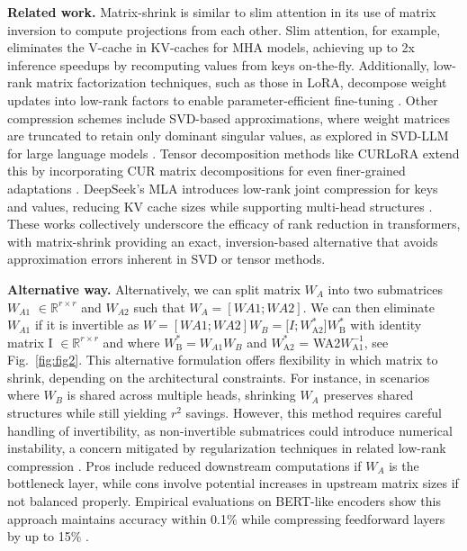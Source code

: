 \documentclass{article}
\begin{document}
\textbf{Related work.} Matrix-shrink is similar to slim attention \cite{graef2025slim} in its use of matrix inversion to compute projections from each other. Slim attention, for example, eliminates the V-cache in KV-caches for MHA models, achieving up to 2x inference speedups by recomputing values from keys on-the-fly. Additionally, low-rank matrix factorization techniques, such as those in LoRA, decompose weight updates into low-rank factors to enable parameter-efficient fine-tuning \cite{medium2025lora}. Other compression schemes include SVD-based approximations, where weight matrices are truncated to retain only dominant singular values, as explored in SVD-LLM for large language models \cite{github2024svdllm}. Tensor decomposition methods like CURLoRA extend this by incorporating CUR matrix decompositions for even finer-grained adaptations \cite{openreview2024svdllm}. DeepSeek's MLA introduces low-rank joint compression for keys and values, reducing KV cache sizes while supporting multi-head structures \cite{deepseek2024}. These works collectively underscore the efficacy of rank reduction in transformers, with matrix-shrink providing an exact, inversion-based alternative that avoids approximation errors inherent in SVD or tensor methods.

\textbf{Alternative way.} Alternatively, we can split matrix $W_A$ into two submatrices $W_{A1}$ $\in \mathbb{R}^{r \times r}$ and $W_{A2}$ such that $W_A = [WA1; WA2]$. We can then eliminate $W_{A1}$ if it is invertible as $W = [WA1; WA2] W_B = [I; W^{*}_{\text{A2}}$]$W^{*}_{\text{B}}$ with identity matrix I $\in \mathbb{R}^{r \times r}$ and where $W^{*}_{\text{B}} = W_{A1} W_B$ and $W^{*}_{\text{A2}}$ = WA2$W^{-1}_{\text{A1}}$, see Fig.~\ref{fig:fig2}. This alternative formulation offers flexibility in which matrix to shrink, depending on the architectural constraints. For instance, in scenarios where $W_B$ is shared across multiple heads, shrinking $W_A$ preserves shared structures while still yielding $r^{2}$ savings. However, this method requires careful handling of invertibility, as non-invertible submatrices could introduce numerical instability, a concern mitigated by regularization techniques in related low-rank compression \cite{uclouvain2024lowrank}. Pros include reduced downstream computations if $W_A$ is the bottleneck layer, while cons involve potential increases in upstream matrix sizes if not balanced properly. Empirical evaluations on BERT-like encoders show this approach maintains accuracy within 0.1\% while compressing feedforward layers by up to 15\% \cite{neurips2022lowrank}.
\end{document}
